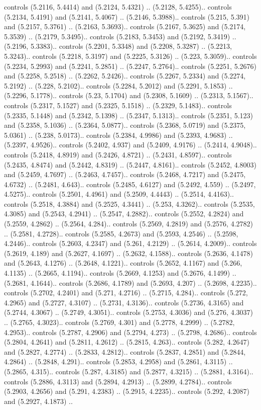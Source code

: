 controls (5.2116, 5.4414) and (5.2124, 5.4321) .. (5.2128, 5.4255).. controls (5.2134, 5.4191) and (5.2141, 5.4067) .. (5.2146, 5.3988).. controls (5.215, 5.391) and (5.2157, 5.3761) .. (5.2163, 5.3693).. controls (5.2167, 5.3625) and (5.2174, 5.3539) .. (5.2179, 5.3495).. controls (5.2183, 5.3453) and (5.2192, 5.3419) .. (5.2196, 5.3383).. controls (5.2201, 5.3348) and (5.2208, 5.3287) .. (5.2213, 5.3243).. controls (5.2218, 5.3197) and (5.2225, 5.3126) .. (5.223, 5.3059).. controls (5.2234, 5.2993) and (5.2241, 5.2851) .. (5.2247, 5.2764).. controls (5.2251, 5.2676) and (5.2258, 5.2518) .. (5.2262, 5.2426).. controls (5.2267, 5.2334) and (5.2274, 5.2192) .. (5.228, 5.2102).. controls (5.2284, 5.2012) and (5.2291, 5.1853) .. (5.2296, 5.1778).. controls (5.23, 5.1704) and (5.2308, 5.1609) .. (5.2313, 5.1567).. controls (5.2317, 5.1527) and (5.2325, 5.1518) .. (5.2329, 5.1483).. controls (5.2335, 5.1448) and (5.2342, 5.1398) .. (5.2347, 5.1313).. controls (5.2351, 5.123) and (5.2358, 5.1036) .. (5.2364, 5.0877).. controls (5.2368, 5.0719) and (5.2375, 5.0361) .. (5.238, 5.0173).. controls (5.2384, 4.9986) and (5.2393, 4.9683) .. (5.2397, 4.9526).. controls (5.2402, 4.937) and (5.2409, 4.9176) .. (5.2414, 4.9048).. controls (5.2418, 4.8919) and (5.2426, 4.8721) .. (5.2431, 4.8597).. controls (5.2435, 4.8474) and (5.2442, 4.8319) .. (5.2447, 4.8161).. controls (5.2452, 4.8003) and (5.2459, 4.7697) .. (5.2463, 4.7457).. controls (5.2468, 4.7217) and (5.2475, 4.6732) .. (5.2481, 4.643).. controls (5.2485, 4.6127) and (5.2492, 4.559) .. (5.2497, 4.5275).. controls (5.2501, 4.4961) and (5.2509, 4.4443) .. (5.2514, 4.4163).. controls (5.2518, 4.3884) and (5.2525, 4.3441) .. (5.253, 4.3262).. controls (5.2535, 4.3085) and (5.2543, 4.2941) .. (5.2547, 4.2882).. controls (5.2552, 4.2824) and (5.2559, 4.2862) .. (5.2564, 4.284).. controls (5.2569, 4.2819) and (5.2576, 4.2782) .. (5.2581, 4.2728).. controls (5.2585, 4.2673) and (5.2593, 4.2546) .. (5.2598, 4.2446).. controls (5.2603, 4.2347) and (5.261, 4.2129) .. (5.2614, 4.2009).. controls (5.2619, 4.189) and (5.2627, 4.1697) .. (5.2632, 4.1588).. controls (5.2636, 4.1478) and (5.2643, 4.1276) .. (5.2648, 4.1221).. controls (5.2652, 4.1167) and (5.266, 4.1135) .. (5.2665, 4.1194).. controls (5.2669, 4.1253) and (5.2676, 4.1499) .. (5.2681, 4.1644).. controls (5.2686, 4.1789) and (5.2693, 4.207) .. (5.2698, 4.2235).. controls (5.2702, 4.2401) and (5.271, 4.2716) .. (5.2715, 4.284).. controls (5.272, 4.2965) and (5.2727, 4.3107) .. (5.2731, 4.3136).. controls (5.2736, 4.3165) and (5.2744, 4.3067) .. (5.2749, 4.3051).. controls (5.2753, 4.3036) and (5.276, 4.3037) .. (5.2765, 4.3023).. controls (5.2769, 4.301) and (5.2778, 4.2999) .. (5.2782, 4.2953).. controls (5.2787, 4.2906) and (5.2794, 4.273) .. (5.2798, 4.2686).. controls (5.2804, 4.2641) and (5.2811, 4.2612) .. (5.2815, 4.263).. controls (5.282, 4.2647) and (5.2827, 4.2774) .. (5.2833, 4.2812).. controls (5.2837, 4.2851) and (5.2844, 4.2864) .. (5.2848, 4.291).. controls (5.2853, 4.2958) and (5.2861, 4.3115) .. (5.2865, 4.315).. controls (5.287, 4.3185) and (5.2877, 4.3215) .. (5.2881, 4.3164).. controls (5.2886, 4.3113) and (5.2894, 4.2913) .. (5.2899, 4.2784).. controls (5.2903, 4.2656) and (5.291, 4.2383) .. (5.2915, 4.2235).. controls (5.292, 4.2087) and (5.2927, 4.1873) .. 